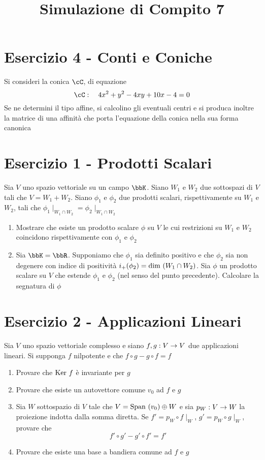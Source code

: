\documentclass[a4paper,NoNotes,GeneralMath]{stdmdoc}
\begin{document}
	\section*{Esercizio 4 - Conti e Coniche}
	Si consideri la conica $\cC$, di equazione $$\cC : \quad 4x^2 + y^2 - 4xy + 10x - 4 = 0$$ Se ne determini il tipo affine, si calcolino gli eventuali centri e si produca inoltre la matrice di una affinità che porta l'equazione della conica nella sua forma canonica

	\newpage
	\title{Simulazione di Compito 7}
	\section*{Esercizio 1 - Prodotti Scalari}
	Sia $V$ uno spazio vettoriale su un campo $\bbK$. Siano $W_1$ e $W_2$ due sottospazi di $V$ tali che $V = W_1 + W_2$. Siano $\phi_1$ e $\phi_2$ due prodotti scalari, rispettivamente su $W_1$ e $W_2$, tali che $\phi_1\mid_{W_1\cap W_2} = \phi_2\mid_{W_1\cap W_2}$
	\begin{enumerate}
		\item Mostrare che esiste un prodotto scalare $\phi$ su $V$ le cui restrizioni su $W_1$ e $W_2$ coincidono rispettivamente con $\phi_1$ e $\phi_2$
		\item Sia $\bbK = \bbR$. Supponiamo che $\phi_1$ sia definito positivo e che $\phi_2$ sia non degenere con indice di positività $i_{+}(\phi_2) = \mbox{dim }(W_1 \cap W_2)$. Sia $\phi$ un prodotto scalare su $V$ che estende $\phi_1$ e $\phi_2$ (nel senso del punto precedente). Calcolare la segnatura di $\phi$
	\end{enumerate}

	\section*{Esercizio 2 - Applicazioni Lineari}
	Sia $V$ uno spazio vettoriale complesso e siano $f,g:V \rightarrow V$ due applicazioni lineari. Si supponga $f$ nilpotente e che $f\circ g - g\circ f = f$
	\begin{enumerate}
		\item Provare che $\mbox{Ker } f$ è invariante per $g$
		\item Provare che esiste un autovettore comune $v_0$ ad $f$ e $g$
		\item Sia $W$ sottospazio di $V$ tale che $V = \mbox{Span }(v_0) \oplus W$ e sia $p_W : V \rightarrow W$ la proiezione indotta dalla somma diretta. Se $f' = p_W \circ f\mid_W$, $g' = p_W \circ g\mid_W$, provare che $$f'\circ g' - g'\circ f' = f'$$
		\item Provare che esiste una base a bandiera comune ad $f$ e $g$
	\end{enumerate}
\end{document}
